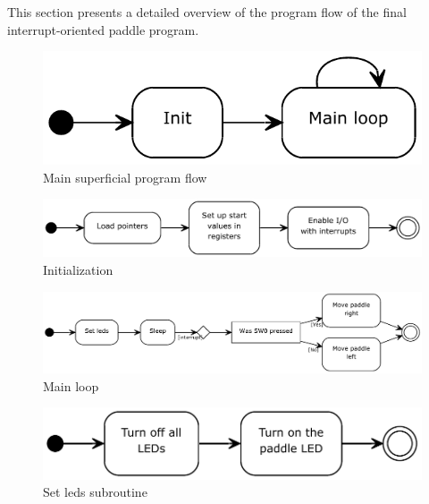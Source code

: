 This section presents a detailed overview of the program flow of the final interrupt-oriented paddle program.

\begin{figure}
\includegraphics[width = \textwidth]{description-and-methodology/program-flow/main-program-flow.pdf}
\caption{Main superficial program flow}
\label{fig:hist}
\end{figure}

\begin{figure}
\includegraphics[width = \textwidth]{description-and-methodology/program-flow/init.pdf}
\caption{Initialization}
\label{fig:hist}
\end{figure}

\begin{figure}
\includegraphics[width = \textwidth]{description-and-methodology/program-flow/main-loop.pdf}
\caption{Main loop}
\label{fig:hist}
\end{figure}

\begin{figure}
\includegraphics[width = \textwidth]{description-and-methodology/program-flow/set-leds.pdf}
\caption{Set leds subroutine}
\label{fig:hist}
\end{figure}

